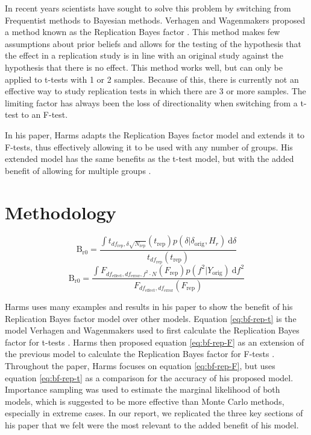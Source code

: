 \documentclass[11pt]{article}
\begin{document}
In recent years scientists have sought to solve this problem by switching from Frequentist methods to Bayesian methods. Verhagen and Wagenmakers proposed a method known as the Replication Bayes factor \citep{Verhagen2014}. This method makes few assumptions about prior beliefs and allows for the testing of the hypothesis that the effect in a replication study is in line with an original study against the hypothesis that there is no effect. This method works well, but can only be applied to t-tests with 1 or 2 samples. Because of this, there is currently not an effective way to study replication tests in which there are 3 or more samples. The limiting factor has always been the loss of directionality when switching from a t-test to an F-test.

In his paper, Harms adapts the Replication Bayes factor model and extends it to F-tests, thus effectively allowing it to be used with any number of groups. His extended model has the same benefits as the t-test model, but with the added benefit of allowing for multiple groups \citep{Harms2019}.


\section{Methodology}

\begin{equation}
	\label{eq:bf-rep-t}
	\text{B}_{\text{r}0} = \frac{\int t_{df_{\mathrm{rep}}, \delta \sqrt{N_{\mathrm{rep}}}}(t_{\mathrm{rep}}) p(\delta | \delta_{\mathrm{orig}}, H_r) \ \mathrm{d}\delta}{t_{df_{\mathrm{rep}}}(t_{\mathrm{rep}})}
\end{equation}
\begin{equation}
	\label{eq:bf-rep-F}
	\text{B}_{\text{r}0} = \frac{\int \! F_{df_{\mathrm{effect}},df_{\mathrm{error}},f^2\cdot N}(F_{\mathrm{rep}}) p(f^2 | Y_{\mathrm{orig}}) \ \mathrm{d}f^2}{F_{df_{\mathrm{effect}},df_{\mathrm{error}}}(F_{\mathrm{rep}})}
\end{equation}

Harms uses many examples and results in his paper to show the benefit of his Replication Bayes factor model over other models. Equation \eqref{eq:bf-rep-t} is the model Verhagen and Wagenmakers used to first calculate the Replication Bayes factor for t-tests \citep{Verhagen2014}. Harms then proposed equation \eqref{eq:bf-rep-F} as an extension of the previous model to calculate the Replication Bayes factor for F-tests \citep{Harms2019}. Throughout the paper, Harms focuses on equation \eqref{eq:bf-rep-F}, but uses equation \eqref{eq:bf-rep-t} as a comparison for the accuracy of his proposed model. Importance sampling was used to estimate the marginal likelihood of both models, which is suggested to be more effective than Monte Carlo methods, especially in extreme cases. In our report, we replicated the three key sections of his paper that we felt were the most relevant to the added benefit of his model. 
\end{document}
